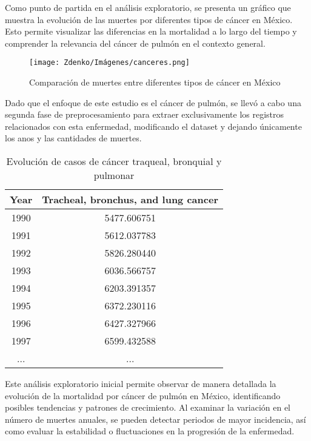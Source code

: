 Como punto de partida en el análisis exploratorio, se presenta un gráfico que muestra la evolución de las muertes por diferentes tipos de cáncer en México. Esto permite visualizar las diferencias en la mortalidad a lo largo del tiempo y comprender la relevancia del cáncer de pulmón en el contexto general.

\begin{figure}[h!] 
    \centering 
    \texttt{[image: Zdenko/Imágenes/canceres.png]}
    \caption{Comparación de muertes entre diferentes tipos de cáncer en México} 
    \label{fig:comparacion_canceres} 
\end{figure}


Dado que el enfoque de este estudio es el cáncer de pulmón, se llevó a cabo una segunda fase de preprocesamiento para extraer exclusivamente los registros relacionados con esta enfermedad, modificando el dataset y dejando únicamente los anos y las cantidades de muertes. 

\begin{table}[ht]
    \centering
    \begin{tabular}{|c|c|}
    \hline
    \textbf{Year} & \textbf{Tracheal, bronchus, and lung cancer} \\ \hline
    1990 & 5477.606751 \\ \hline
    1991 & 5612.037783 \\ \hline
    1992 & 5826.280440 \\ \hline
    1993 & 6036.566757 \\ \hline
    1994 & 6203.391357 \\ \hline
    1995 & 6372.230116 \\ \hline
    1996 & 6427.327966 \\ \hline
    1997 & 6599.432588 \\ \hline
    ... & ... \\ \hline
    \end{tabular}
    \caption{Evolución de casos de cáncer traqueal, bronquial y pulmonar}
    \label{table:lung_cancer}
\end{table}


Este análisis exploratorio inicial permite observar de manera detallada la evolución de la mortalidad por cáncer de pulmón en México, identificando posibles tendencias y patrones de crecimiento. Al examinar la variación en el número de muertes anuales, se pueden detectar periodos de mayor incidencia, así como evaluar la estabilidad o fluctuaciones en la progresión de la enfermedad.

